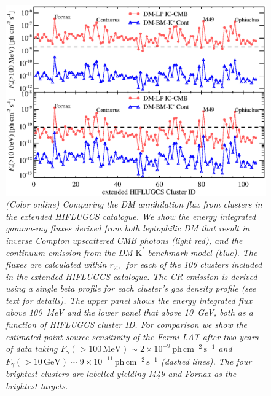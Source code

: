 \documentclass[10pt,aps,pra,reprint,amsmath,amsfonts,amssymb,showpacs,nofootinbib,floatfix]{revtex4-1}
\newcommand{\Fermi}{{\em Fermi}\xspace}
\newcommand{\rmn}{\mathrm}
\newcommand{\Kp}{\rmn{K}^\prime}
\newcommand{\rvir}{r_{200}}
\begin{document}
\begin{figure}%
\begin{minipage}{2.0\columnwidth}
 \includegraphics[width=0.99\columnwidth]{figures/Flux.comp.DM.eps}
 \caption{\it (Color online) Comparing the DM annihilation flux from
   clusters in the extended HIFLUGCS catalogue. We show the energy
   integrated gamma-ray fluxes derived from both leptophilic DM that
   result in inverse Compton upscattered CMB photons (light red), and
   the continuum emission from the DM $\Kp$ benchmark model
   (blue). The fluxes are calculated within $\rvir$ for each of the
   106 clusters included in the extended HIFLUGCS catalogue. The CR
   emission is derived using a single beta profile for each cluster's
   gas density profile (see text for details). The upper panel shows
   the energy integrated flux above 100~MeV and the lower panel that
   above 10~GeV, both as a function of HIFLUGCS cluster ID. For
   comparison we show the estimated point source sensitivity of the
   \Fermi-LAT after two years of data taking
   $F_\gamma(>100\,\rmn{MeV})\sim 2\times10^{-9}\,\rmn{ph}\,
   \rmn{cm}^{-2}\,\rmn{s}^{-1}$ and $F_\gamma(>10\,\rmn{GeV})\sim
   9\times10^{-11}\,\rmn{ph}\, \rmn{cm}^{-2}\,\rmn{s}^{-1}$ (dashed
   lines). The four brightest clusters are labelled yielding M49 and
   Fornax as the brightest targets.}
 \label{fig21}
\end{minipage}
\end{figure}
\end{document}

